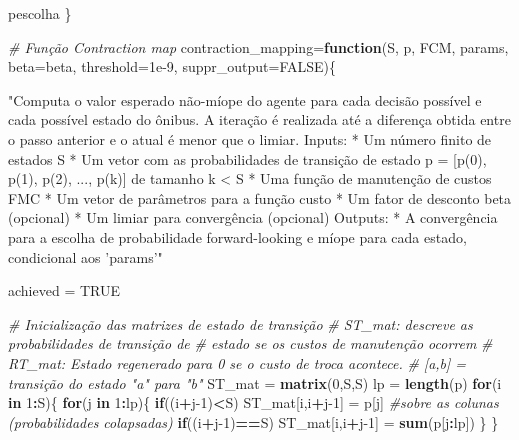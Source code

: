 \documentclass[12pt,a4paper]{article}
\newenvironment{Shaded}{\begin{snugshade}}{\end{snugshade}}
\newcommand{\CommentTok}[1]{\textcolor[rgb]{0.56,0.35,0.01}{\textit{#1}}}
\newcommand{\ControlFlowTok}[1]{\textcolor[rgb]{0.13,0.29,0.53}{\textbf{#1}}}
\newcommand{\DataTypeTok}[1]{\textcolor[rgb]{0.13,0.29,0.53}{#1}}
\newcommand{\DecValTok}[1]{\textcolor[rgb]{0.00,0.00,0.81}{#1}}
\newcommand{\FloatTok}[1]{\textcolor[rgb]{0.00,0.00,0.81}{#1}}
\newcommand{\KeywordTok}[1]{\textcolor[rgb]{0.13,0.29,0.53}{\textbf{#1}}}
\newcommand{\NormalTok}[1]{#1}
\newcommand{\OperatorTok}[1]{\textcolor[rgb]{0.81,0.36,0.00}{\textbf{#1}}}
\newcommand{\OtherTok}[1]{\textcolor[rgb]{0.56,0.35,0.01}{#1}}
\newcommand{\StringTok}[1]{\textcolor[rgb]{0.31,0.60,0.02}{#1}}
\begin{document}
\begin{Shaded}
\begin{Highlighting}[]
{\NormalTok{  pescolha}
\NormalTok{\}}

\CommentTok{# Função Contraction map}
\NormalTok{contraction_mapping=}\ControlFlowTok{function}\NormalTok{(S, }
\NormalTok{                             p, }
\NormalTok{                             FCM, }
\NormalTok{                             params, }
                             \DataTypeTok{beta=}\NormalTok{beta, }
                             \DataTypeTok{threshold=}\FloatTok{1e-9}\NormalTok{, }
                             \DataTypeTok{suppr_output=}\OtherTok{FALSE}\NormalTok{)\{}
  
  \StringTok{"Computa o valor esperado não-míope do agente para cada decisão possível }
\StringTok{  e cada possível estado do ônibus.}
\StringTok{  A iteração é realizada até a diferença obtida entre o passo}
\StringTok{  anterior e o atual}
\StringTok{  é menor que o limiar.}
\StringTok{  Inputs:}
\StringTok{  * Um número finito de estados S}
\StringTok{  * Um vetor com as probabilidades de transição de estado }
\StringTok{  p = [p(0), p(1), p(2), ..., p(k)] de tamanho k < S}
\StringTok{  * Uma função de manutenção de custos FMC}
\StringTok{  * Um vetor de parâmetros para a função custo}
\StringTok{  * Um fator de desconto beta (opcional)}
\StringTok{  * Um limiar para convergência (opcional)}
\StringTok{  Outputs:}
\StringTok{  * A convergência para a escolha de probabilidade forward-looking e }
\StringTok{  míope para cada estado, condicional aos 'params'"}
  
\NormalTok{  achieved =}\StringTok{ }\OtherTok{TRUE}
  
  \CommentTok{# Inicialização das matrizes de estado de transição}
  \CommentTok{# ST_mat: descreve as probabilidades de transição de }
  \CommentTok{# estado se os custos de manutenção ocorrem}
  \CommentTok{# RT_mat: Estado regenerado para 0 se o custo de troca acontece.}
  \CommentTok{# [a,b] = transição do estado "a" para "b"}
\NormalTok{  ST_mat =}\StringTok{ }\KeywordTok{matrix}\NormalTok{(}\DecValTok{0}\NormalTok{,S,S)}
\NormalTok{  lp =}\StringTok{ }\KeywordTok{length}\NormalTok{(p)}
  \ControlFlowTok{for}\NormalTok{(i }\ControlFlowTok{in} \DecValTok{1}\OperatorTok{:}\NormalTok{S)\{}
    \ControlFlowTok{for}\NormalTok{(j }\ControlFlowTok{in} \DecValTok{1}\OperatorTok{:}\NormalTok{lp)\{}
      \ControlFlowTok{if}\NormalTok{((i}\OperatorTok{+}\NormalTok{j}\DecValTok{-1}\NormalTok{)}\OperatorTok{<}\NormalTok{S)  ST_mat[i,i}\OperatorTok{+}\NormalTok{j}\DecValTok{-1}\NormalTok{] =}\StringTok{ }\NormalTok{p[j]}
      \CommentTok{#sobre as colunas (probabilidades colapsadas)}
      \ControlFlowTok{if}\NormalTok{((i}\OperatorTok{+}\NormalTok{j}\DecValTok{-1}\NormalTok{)}\OperatorTok{==}\NormalTok{S) ST_mat[i,i}\OperatorTok{+}\NormalTok{j}\DecValTok{-1}\NormalTok{] =}\StringTok{ }\KeywordTok{sum}\NormalTok{(p[j}\OperatorTok{:}\NormalTok{lp]) }
\NormalTok{    \}}
\NormalTok{  \}}
  
}
\end{Highlighting}
\end{Shaded}
\end{document}
